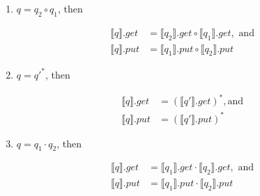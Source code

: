 \documentclass{svproc}
\begin{document}
\begin{enumerate}
  \item
  $q = q_2 \circ q_1$, then
  \begin{prooftree}
\end{prooftree}
  \begin{align*}
  \llbracket q \rrbracket.get &= \llbracket q_2 \rrbracket.get\circ \llbracket
  q_1 \rrbracket.get, \text{ and }\\
  \llbracket q \rrbracket.put &= \llbracket q_1 \rrbracket.put \circ \llbracket
  q_2 \rrbracket.put
  \end{align*}
  \item
  $q = {q'}^*$, then
    \begin{prooftree}
\end{prooftree}
  \begin{align*}
  \llbracket q \rrbracket.get &= (\llbracket q' \rrbracket.get)^*, \text{
  and }\\
  \llbracket q \rrbracket.put &= (\llbracket q' \rrbracket.put)^*
  \end{align*}

  \item
  $q = q_1 \cdot q_2$, then
    \begin{prooftree}
\end{prooftree}
  \begin{align*}
  \llbracket q \rrbracket.get &= \llbracket q_1 \rrbracket.get \cdot \llbracket
  q_2 \rrbracket.get, \text{ and }\\
  \llbracket q \rrbracket.put &= \llbracket q_1 \rrbracket.put \cdot \llbracket
  q_2 \rrbracket.put
  \end{align*}


\end{enumerate}
\end{document}
